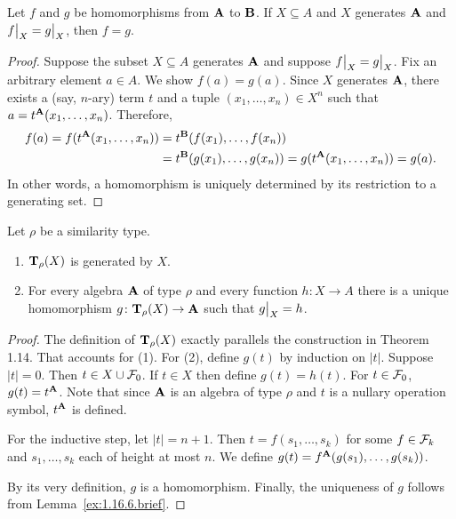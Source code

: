 \documentclass[12pt]{amsart}  %
\begin{document}
\begin{lemma}
  \label{ex:1.16.6.brief} 
  Let $f$ and $g$ be homomorphisms from $\mathbf{A}$ to $\mathbf{B}$.
If $X \subseteq A$ and $X$ generates $\mathbf{A}$ and
    $\restr{f}{X} = \restr{g}{X}$, then $f = g$. 
\end{lemma}
\begin{proof}
  Suppose the subset $X \subseteq A$ generates $\mathbf{A}$ and suppose
  $\restr{f}{X} = \restr{g}{X}$.
  Fix an arbitrary element $a\in A$.  We show $f(a) = g(a)$.
  Since $X$ generates $\mathbf{A}$, there exists a (say, $n$-ary) term $t$ and 
  a tuple $(x_1, \dots, x_n) \in X^n$ such that 
  $a = t^{\mathbf{A}}(x_1, \dots, x_n)$. Therefore, 
  \begin{align*}
    f(a) = f(t^{\mathbf{A}}(x_1, \dots, x_n)) &= t^{\mathbf{B}}(f(x_1), \dots, f(x_n))\\
                                    &= t^{\mathbf{B}}(g(x_1), \dots, g(x_n))
                                     = g(t^{\mathbf{A}}(x_1, \dots, x_n)) = g(a).
  \end{align*}
  In other words, a homomorphism is uniquely determined by its restriction to 
  a generating set. 
\end{proof}

\begin{theorem} 
  \label{thm:4.21}
  Let $\rho$ be a similarity type.
  \begin{enumerate}
    \item $\mathbf{T}_\rho(X)$ is generated by $X$.
    \item For every algebra $\mathbf{A}$ of type $\rho$ and every function 
    $h\colon X \to A$ there is a unique homomorphism $g\colon \mathbf{T}_\rho(X) \to \mathbf{A}$ 
    such that $\restr{g}{X} = h$.
  \end{enumerate}
\end{theorem}
\begin{proof} The definition of $\mathbf{T}_\rho(X)$ exactly parallels the construction in 
Theorem 1.14. That accounts for (1). For (2), define $g(t)$ by induction on $|t|$. 
Suppose $|t| = 0$. Then $t \in X \cup \mathcal{F}_0$. If $t \in X$ then define 
$g(t) = h(t)$. For $t \in \mathcal{F}_0$, $g(t) = t^{\mathbf{A}}$. 
Note that since $\mathbf{A}$ is an algebra of type $\rho$ and $t$ is a nullary 
operation symbol, $t^{\mathbf{A}}$ is defined.

For the inductive step, let $|t| = n + 1$. Then $t = f(s_1, \dots, s_k)$ for some 
$f \in \mathcal{F}_k$ and $s_1, \dots, s_k$ each of height at most $n$. We define
$g(t) = f^{\mathbf{A}}(g(s_1), \dots, g(s_k))$.

By its very definition, $g$ is a homomorphism.
Finally, the uniqueness of $g$ follows from Lemma~\ref{ex:1.16.6.brief}. 
\end{proof}
\end{document}
